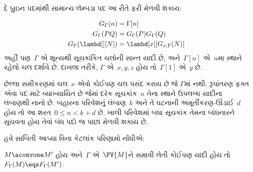 \documentclass[../../../include/open-logic-section]{subfiles}
\begin{document}
દે બ્રુઇન પદમાંથી સામાન્ય લૅમ્બડા પદ આ રીતે ફરી મેળવી શકાય:

\begin{defn}
  \begin{align*}
    G_\Gamma(n) &= \Gamma[n] \\
    G_\Gamma(PQ) &= G_\Gamma(P) G_\Gamma(Q) \\
    G_\Gamma(\lambd[][N]) &= \lambd[x][G_{x,\Gamma}(N)]
  \end{align*}
  અહીં પણ~$\Gamma$ એ શૂન્યથી સૂચકાંકિત ચલોની સાન્ત યાદી છે,
  અને~$\Gamma[n]$ એ~$n$મા સ્થાને રહેલો ચલ દર્શાવે છે.
  દાખલા તરીકે, $\Gamma$ એ~$x,y,z$ હોય તો~$\Gamma[1]$
  એ~$y$ છે.

  છેલ્લા સમીકરણમાં ચલ~$x$ એવો કોઈપણ ચલ પસંદ કરાય છે જે
  $\Gamma$માં નથી.
  રૂપાંતરણ ફક્ત એવા પદ માટે વ્યાખ્યાયિત છે જેમાં દરેક સૂચકાંક~$n$
  તેના સ્થાને ઉપલબ્ધ યાદીના લંબાણથી નાનો છે. બહારના પરિવેશનું
  લંબાણ~$k$ અને તે ઘટનાની અમૂર્તીકરણ-ઊંડાઈ~$d$ હોય તો આ
  શરત~$0\leq n<k+d$ છે. ખાલી પરિવેશમાં બધા સૂચકાંક તેમના
  બાંધનારને સૂચવતા હોય તેવાં બંધ પદો જ પાછાં મેળવી શકાય છે.
\end{defn}

હવે સાબિતી આપ્યા વિના કેટલાંક પરિણામો નોંધીએ:

\begin{prop}
  $M \aconvone M'$ હોય અને~$\Gamma$ એ~$\FV{M}$ને સમાવી
  લેતી કોઈપણ યાદી હોય તો
  $F_\Gamma(M) \eqs F_\Gamma(M')$.
\end{prop}
\end{document}
